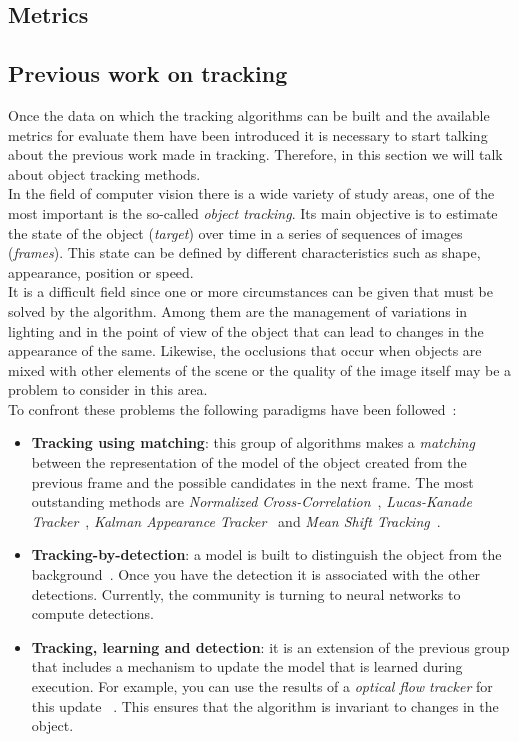 \subsection{Metrics}
\subsection{Previous work on tracking}
Once the data on which the tracking algorithms can be built and the available metrics for evaluate them have been introduced it is necessary to start talking about the previous work made in tracking. Therefore, in this section we will talk about object tracking methods.\\
In the field of computer vision there is a wide variety of study areas, one of the most important is the so-called \textit{object tracking}. Its main objective is to estimate the state of the object (\textit{target}) over time in a series of sequences of images (\textit{frames}). This state can be defined by different characteristics such as shape, appearance, position or speed.\\
It is a difficult field since one or more circumstances can be given that must be solved by the algorithm. Among them are the management of variations in lighting and in the point of view of the object that can lead to changes in the appearance of the same. Likewise, the occlusions that occur when objects are mixed with other elements of the scene or the quality of the image itself may be a problem to consider in this area.\\
To confront these problems the following paradigms have been followed~\cite{smeulders2014visual}:
\begin{itemize}
\item \textbf{Tracking using matching}: this group of algorithms makes a \textit {matching} between the representation of the model of the object created from the previous frame and the possible candidates in the next frame. The most outstanding methods are \textit{Normalized Cross-Correlation}~\cite{briechle2001template}, \textit{Lucas-Kanade Tracker}~\cite {baker2004lucas}, \textit{Kalman Appearance Tracker}~\cite{nguyen2004fast} and \textit{Mean Shift Tracking}~\cite{comaniciu2000real}.
\item \textbf{Tracking-by-detection}: a model is built to distinguish the object from the background~\cite{nguyen2006robust}. Once you have the detection it is associated with the other detections. Currently, the community is turning to neural networks to compute detections.
\item \textbf{Tracking, learning and detection}: it is an extension of the previous group that includes a mechanism to update the model that is learned during execution. For example, you can use the results of a \textit{optical flow tracker} for this update ~\cite{kalal2010pn}. This ensures that the algorithm is invariant to changes in the object. 
\end{itemize}
